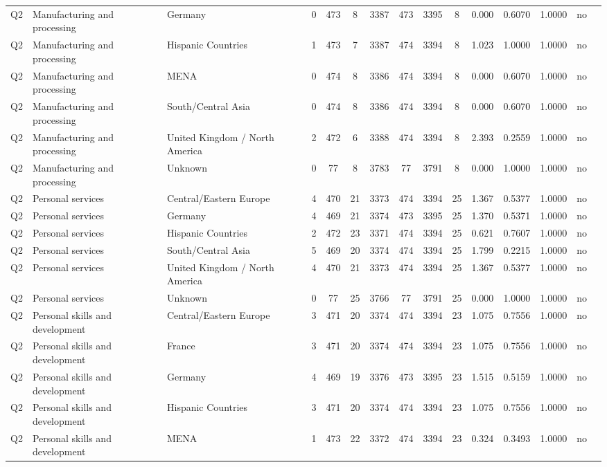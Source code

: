 \begin{longtable}{lllrcccccccccll}
Q2 & Manufacturing and processing & Germany & 0 & 473 & 8 & 3387 & 473 & 3395 & 8 & 0.000 & 0.6070 & 1.0000 & no \\
Q2 & Manufacturing and processing & Hispanic Countries & 1 & 473 & 7 & 3387 & 474 & 3394 & 8 & 1.023 & 1.0000 & 1.0000 & no \\
Q2 & Manufacturing and processing & MENA & 0 & 474 & 8 & 3386 & 474 & 3394 & 8 & 0.000 & 0.6070 & 1.0000 & no \\
Q2 & Manufacturing and processing & South/Central Asia & 0 & 474 & 8 & 3386 & 474 & 3394 & 8 & 0.000 & 0.6070 & 1.0000 & no \\
Q2 & Manufacturing and processing & United Kingdom / North America & 2 & 472 & 6 & 3388 & 474 & 3394 & 8 & 2.393 & 0.2559 & 1.0000 & no \\
Q2 & Manufacturing and processing & Unknown & 0 & 77 & 8 & 3783 & 77 & 3791 & 8 & 0.000 & 1.0000 & 1.0000 & no \\
Q2 & Personal services & Central/Eastern Europe & 4 & 470 & 21 & 3373 & 474 & 3394 & 25 & 1.367 & 0.5377 & 1.0000 & no \\
Q2 & Personal services & Germany & 4 & 469 & 21 & 3374 & 473 & 3395 & 25 & 1.370 & 0.5371 & 1.0000 & no \\
Q2 & Personal services & Hispanic Countries & 2 & 472 & 23 & 3371 & 474 & 3394 & 25 & 0.621 & 0.7607 & 1.0000 & no \\
Q2 & Personal services & South/Central Asia & 5 & 469 & 20 & 3374 & 474 & 3394 & 25 & 1.799 & 0.2215 & 1.0000 & no \\
Q2 & Personal services & United Kingdom / North America & 4 & 470 & 21 & 3373 & 474 & 3394 & 25 & 1.367 & 0.5377 & 1.0000 & no \\
Q2 & Personal services & Unknown & 0 & 77 & 25 & 3766 & 77 & 3791 & 25 & 0.000 & 1.0000 & 1.0000 & no \\
Q2 & Personal skills and development & Central/Eastern Europe & 3 & 471 & 20 & 3374 & 474 & 3394 & 23 & 1.075 & 0.7556 & 1.0000 & no \\
Q2 & Personal skills and development & France & 3 & 471 & 20 & 3374 & 474 & 3394 & 23 & 1.075 & 0.7556 & 1.0000 & no \\
Q2 & Personal skills and development & Germany & 4 & 469 & 19 & 3376 & 473 & 3395 & 23 & 1.515 & 0.5159 & 1.0000 & no \\
Q2 & Personal skills and development & Hispanic Countries & 3 & 471 & 20 & 3374 & 474 & 3394 & 23 & 1.075 & 0.7556 & 1.0000 & no \\
Q2 & Personal skills and development & MENA & 1 & 473 & 22 & 3372 & 474 & 3394 & 23 & 0.324 & 0.3493 & 1.0000 & no \\

\end{longtable}
